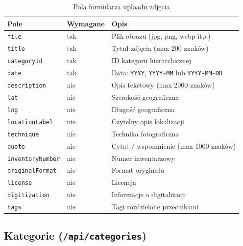 \documentclass[12pt, a4paper]{article}
\begin{document}
\begin{table}[H]
  \centering
  \caption{Pola formularza uploadu zdjęcia}
  \begin{tabular}{@{}L{3.5cm}L{2cm}L{8.5cm}@{}}
    \toprule
    \textbf{Pole} & \textbf{Wymagane} & \textbf{Opis} \\
    \midrule
    \texttt{file}            & tak & Plik obrazu (jpg, png, webp itp.) \\
    \texttt{title}           & tak & Tytuł zdjęcia (max 200 znaków) \\
    \texttt{categoryId}      & tak & ID kategorii hierarchicznej \\
    \texttt{date}            & tak & Data: \texttt{YYYY}, \texttt{YYYY-MM} lub \texttt{YYYY-MM-DD} \\
    \texttt{description}     & nie & Opis tekstowy (max 2000 znaków) \\
    \texttt{lat}             & nie & Szerokość geograficzna \\
    \texttt{lng}             & nie & Długość geograficzna \\
    \texttt{locationLabel}   & nie & Czytelny opis lokalizacji \\
    \texttt{technique}       & nie & Technika fotograficzna \\
    \texttt{quote}           & nie & Cytat / wspomnienie (max 1000 znaków) \\
    \texttt{inventoryNumber} & nie & Numer inwentarzowy \\
    \texttt{originalFormat}  & nie & Format oryginału \\
    \texttt{license}         & nie & Licencja \\
    \texttt{digitization}    & nie & Informacje o digitalizacji \\
    \texttt{tags}            & nie & Tagi rozdzielone przecinkami \\
    \bottomrule
  \end{tabular}
\end{table}

\subsection{Kategorie (\texttt{/api/categories})}
\end{document}
